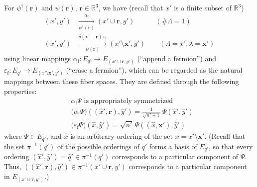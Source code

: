 \documentclass[12pt]{article}
\newcommand{\RRR}{\mathbb{R}} %
\newcommand{\1}{\mathbf{1}} %
\newcommand{\covering}{\pi} %
\newcommand{\vx}{{\boldsymbol x}} %
\newcommand{\vr}{{\boldsymbol r}}
\newcommand{\fer}{{\mathrm{f}}} %
\begin{document}
For $\psi^\dag(\vr)$ and $\psi(\vr)$, $\vr \in \RRR^3$, we have
(recall that $x'$ is a finite subset of $\RRR^3$)
\begin{subequations}
\begin{align}
   (x',y')& \xrightarrow[\psi^\dag(\vr)] {\alpha_\fer} (x' \cup \vr,y')
   \qquad\quad (\#\Lambda =1) \\ (x',y')& \xrightarrow[\psi(\vr)]
   {\delta(\vx'-\vr) \, \varepsilon_\fer} (x' \setminus \vx',y') \qquad
   (\Lambda = x', \lambda=\vx')
\end{align}
\end{subequations}
using linear mappings $\alpha_\fer: E_{q'} \to E_{ (x' \cup \vr,y')}$
(``append a fermion'') and $\varepsilon_\fer: E_{q'} \to E_{ (x'
\setminus \vx',y')}$ (``erase a fermion''), which can be regarded as
the natural mappings between these fiber spaces. They are defined
through the following properties:
\begin{subequations}
\begin{align}
   &\alpha_\fer \Psi\text{ is appropriately symmetrized} \\
   &\big(\alpha_\fer \Psi\big)((\hat{x}', \vr), \hat{y}') =
\frac{1}{\sqrt{n'
   +1}} \, \Psi(\hat{x}',\hat{y}') \\
   &\big(\varepsilon_\fer \Psi\big) (\hat{x},\hat{y}') =
   \sqrt{n'} \, \Psi((\hat{x}, \vx'),\hat{y}')
\end{align}
\end{subequations}
where $\Psi \in E_{q'}$, and $\hat{x}$ is an arbitrary ordering of the
set $x=x' \setminus \vx'$. (Recall that the set $\covering^{-1}(q')$ of
the possible orderings of $q'$ forms a basis of $E_{q'}$, so that
every ordering $(\hat{x}', \hat{y}') = \hat{q}' \in
\covering^{-1}(q')$ corresponds to a particular component of
$\Psi$. Thus, $((\hat{x}',\vr),\hat{y}') \in \covering^{-1}(x' \cup \vr,
y')$ corresponds to a particular component in $E_{(x' \cup \vr, y')}$.)
\end{document}
